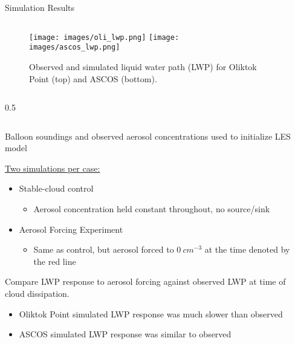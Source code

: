 \documentclass[final]{beamer}
\newlength{\sepwid}
\newlength{\twocolwid}
\begin{document}
\begin{frame}[t]
\begin{columns}[t]
\begin{column}{\twocolwid}
	\begin{alertblock}{Simulation Results}
		\begin{column}{0.59\linewidth}
			\begin{figure}
				\centering
				\texttt{[image: images/oli\_lwp.png]}
				\texttt{[image: images/ascos\_lwp.png]}
				\caption{Observed and simulated liquid water path (LWP) for Oliktok Point (top) and ASCOS (bottom).}
			\end{figure}
		\end{column}
		\begin{column}{0.5\sepwid}\end{column}
		\begin{column}{0.39\linewidth}
			Balloon soundings and observed aerosol concentrations used to initialize LES model
			\vspace{0.1 em}

			\underline{Two simulations per case:}
			\begin{itemize}
				\item Stable-cloud control
				\begin{itemize}
					\item Aerosol concentration held constant throughout, no source/sink
				\end{itemize}
				\item Aerosol Forcing Experiment
				\begin{itemize}
					\item Same as control, but aerosol forced to $0\ cm^{-3}$ at the time denoted by the red line
				\end{itemize}
			\end{itemize}
			\vspace{0.1em}
			Compare LWP response to aerosol forcing against observed LWP at time of cloud dissipation.
			\begin{itemize}
				\item Oliktok Point simulated LWP response was much slower than observed
				\item ASCOS simulated LWP response was similar to observed
			\end{itemize}
		\end{column}
	\end{alertblock}
\end{column}



\begin{column}{\sepwid}\end{column}


\end{columns}
\end{frame}
\end{document}
